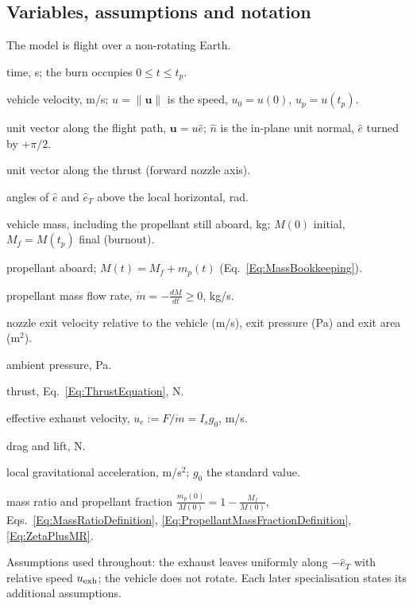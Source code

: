 \subsection{Variables, assumptions and notation}
\label{sec:va-notation}
The model is flight over a non-rotating Earth.
\begin{description}\itemsep1pt
\item[$t$] time, s; the burn occupies $0\le t\le t_p$.
\item[$\mathbf u(t)$] vehicle velocity, m/s; $u=\lVert\mathbf u\rVert$ is
  the speed, $u_0=u(0)$, $u_p=u(t_p)$.
\item[$\hat e(t)$] unit vector along the flight path, $\mathbf u=u\hat e$;
  $\hat n$ is the in-plane unit normal, $\hat e$ turned by $+\pi/2$.
\item[$\hat e_T$] unit vector along the thrust (forward nozzle axis).
\item[$\theta,\ \psi$] angles of $\hat e$ and $\hat e_T$ above the local
  horizontal, rad.
\item[$M(t)$] vehicle mass, including the propellant still aboard, kg;
  $M(0)$ initial, $M_f=M(t_p)$ final (burnout).
\item[$m_p(t)$] propellant aboard; $M(t)=M_f+m_p(t)$
  (Eq.~\ref{Eq:MassBookkeeping}).
\item[$\dot m(t)$] propellant mass flow rate, $\dot m=-\frac{dM}{dt}\ge0$,
  kg/s.
\item[$u_{\rm exh},\ p_{\rm exh},\ A_e$] nozzle exit velocity relative to the
  vehicle (m/s), exit pressure (Pa) and exit area (m$^2$).
\item[$p_a$] ambient pressure, Pa.
\item[$F$] thrust, Eq.~\ref{Eq:ThrustEquation}, N.
\item[$u_e$] effective exhaust velocity, $u_e:=F/\dot m=I_sg_0$, m/s.
\item[$D,\ L$] drag and lift, N.
\item[$g$] local gravitational acceleration, m/s$^2$; $g_0$ the standard
  value.
\item[$\frac{M_f}{M(0)},\ \zeta$] mass ratio and propellant fraction
  $\frac{m_p(0)}{M(0)}=1-\frac{M_f}{M(0)}$, Eqs.~\ref{Eq:MassRatioDefinition},
  \ref{Eq:PropellantMassFractionDefinition}, \ref{Eq:ZetaPlusMR}.
\end{description}
Assumptions used throughout: the exhaust leaves uniformly along
$-\hat e_T$ with relative speed $u_{\rm exh}$; the vehicle does not rotate.
Each later specialisation states its additional assumptions.

